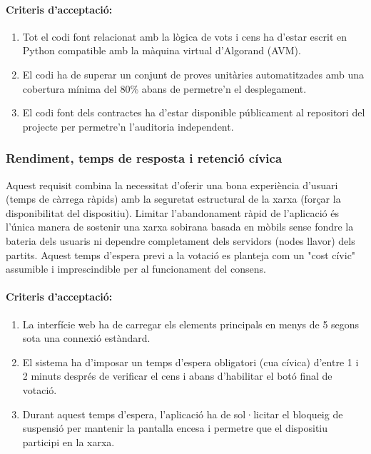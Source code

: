 \paragraph{Criteris d'acceptació:}
\begin{enumerate}[label=\roman*.]
    \item Tot el codi font relacionat amb la lògica de vots i cens ha d'estar escrit en Python compatible amb la màquina virtual d'Algorand (AVM).
    \item El codi ha de superar un conjunt de proves unitàries automatitzades amb una cobertura mínima del 80\% abans de permetre'n el desplegament.
    \item El codi font dels contractes ha d'estar disponible públicament al repositori del projecte per permetre'n l'auditoria independent.
\end{enumerate}

\subsubsection{Rendiment, temps de resposta i retenció cívica}

Aquest requisit combina la necessitat d'oferir una bona experiència d'usuari (temps de càrrega ràpids) amb la seguretat estructural de la xarxa (forçar la disponibilitat del dispositiu). 
Limitar l'abandonament ràpid de l'aplicació és l'única manera de sostenir una xarxa sobirana basada en mòbils sense fondre la bateria dels usuaris ni dependre completament dels servidors (nodes llavor) dels partits. 
Aquest temps d'espera previ a la votació es planteja com un "cost cívic" assumible i imprescindible per al funcionament del consens.

\paragraph{Criteris d'acceptació:}
\begin{enumerate}[label=\roman*.]
    \item La interfície web ha de carregar els elements principals en menys de 5 segons sota una connexió estàndard.
    \item El sistema ha d'imposar un temps d'espera obligatori (cua cívica) d'entre 1 i 2 minuts després de verificar el cens i abans d'habilitar el botó final de votació.
    \item Durant aquest temps d'espera, l'aplicació ha de sol·licitar el bloqueig de suspensió per mantenir la pantalla encesa i permetre que el dispositiu participi en la xarxa.
\end{enumerate}

